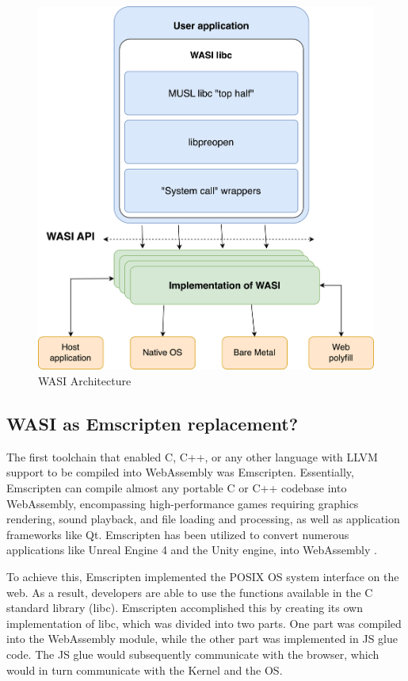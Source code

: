 \begin{figure}[H]
	\centering
		\includegraphics[width=130mm,scale=0.8]{images/wasm/WASI_Architecture.png}
	\caption{WASI Architecture}
	\label{fig:wasi-architecture}
\end{figure}

\subsection{WASI as Emscripten replacement?}
The first toolchain that enabled C, C++, or any other language with \gls{LLVM} support to be compiled into WebAssembly was Emscripten. Essentially, Emscripten can compile almost any portable C or C++ codebase into WebAssembly, encompassing high-performance games requiring graphics rendering, sound playback, and file loading and processing, as well as application frameworks like Qt. Emscripten has been utilized to convert numerous applications like Unreal Engine 4 and the Unity engine, into WebAssembly \cite{emscriptencommunity_2023_emscripten}. 

To achieve this, Emscripten implemented the \gls{POSIX} OS system interface on the web. As a result, developers are able to use the functions available in the C standard library (\gls{libc}). 
Emscripten accomplished this by creating its own implementation of libc, which was divided into two parts. One part was compiled into the WebAssembly module, while the other part was implemented in \gls{JS glue code}. The JS glue would subsequently communicate with the browser, which would in turn communicate with the Kernel and the OS.

